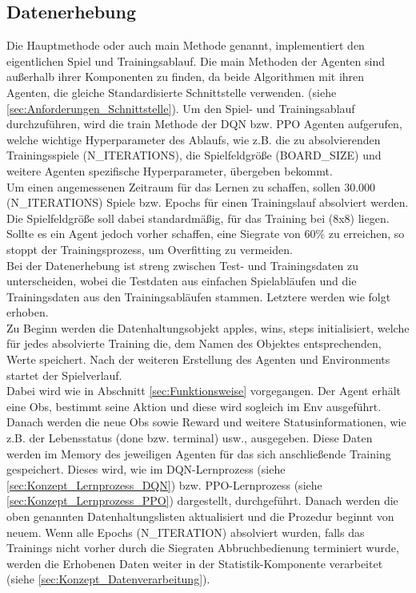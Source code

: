 \subsection{Datenerhebung} \label{sec:Konzept_Datenerhebung}
Die Hauptmethode oder auch main Methode genannt, implementiert den eigentlichen Spiel und Trainingsablauf. Die main Methoden der Agenten sind außerhalb ihrer Komponenten zu finden, da beide Algorithmen mit ihren Agenten, die gleiche Standardisierte Schnittstelle verwenden. (siehe \ref{sec:Anforderungen_Schnittstelle}). 
Um den Spiel- und Trainingsablauf durchzuführen, wird die train Methode der DQN bzw. PPO Agenten aufgerufen, welche wichtige Hyperparameter des Ablaufs, wie z.B. die zu absolvierenden Trainingsspiele (N\_ITERATIONS), die Spielfeldgröße (BOARD\_SIZE) und weitere Agenten spezifische Hyperparameter, übergeben bekommt.\\
Um einen angemessenen Zeitraum für das Lernen zu schaffen, sollen 30.000 (N\_ITERATIONS) Spiele bzw. Epochs  für einen Trainingslauf absolviert werden. Die Spielfeldgröße soll dabei standardmäßig, für das Training bei (8x8) liegen. Sollte es ein Agent jedoch vorher schaffen, eine Siegrate von 60\% zu erreichen, so stoppt der Trainingsprozess, um Overfitting zu vermeiden.\\
Bei der Datenerhebung ist streng zwischen Test- und Trainingsdaten zu unterscheiden, wobei die Testdaten aus einfachen Spielabläufen und die Trainingsdaten aus den Trainingsabläufen stammen. Letztere werden wie folgt erhoben.\\
Zu Beginn werden die Datenhaltungsobjekt apples, wins, steps initialisiert, welche für jedes absolvierte Training die, dem Namen des Objektes entsprechenden, Werte speichert. Nach der weiteren Erstellung des Agenten und Environments startet der Spielverlauf.\\
Dabei wird wie in Abschnitt \ref{sec:Funktionsweise} vorgegangen. Der Agent erhält eine Obs, bestimmt seine Aktion und diese wird sogleich im Env ausgeführt. Danach werden die neue Obs sowie Reward und weitere Statusinformationen, wie z.B. der Lebensstatus (done bzw. terminal) usw., ausgegeben. Diese Daten werden im Memory des jeweiligen Agenten für das sich anschließende Training gespeichert. Dieses wird, wie im DQN-Lernprozess (siehe \ref{sec:Konzept_Lernprozess_DQN}) bzw. PPO-Lernprozess (siehe \ref{sec:Konzept_Lernprozess_PPO}) dargestellt, durchgeführt. Danach werden die oben genannten Datenhaltungslisten aktualisiert und die Prozedur beginnt von neuem. Wenn alle Epochs (N\_ITERATION) absolviert wurden, falls das Trainings nicht vorher durch die Siegraten Abbruchbedienung terminiert wurde, werden die Erhobenen Daten weiter in der Statistik-Komponente verarbeitet (siehe \ref{sec:Konzept_Datenverarbeitung}).\\
